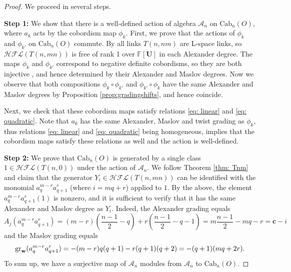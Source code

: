 \documentclass[10pt,a4paper]{amsart}
\newcommand{\CA}{\mathcal{A}}
\newcommand{\Cab}{\mathrm{Cab}}
\newcommand{\F}{\mathbb{F}}
\newcommand{\cHFL}{\mathcal{H\!F\! L}}
\newcommand{\w}{\mathbf{w}}
\def\gr{\textup{gr}}
\def\w{{\bf{w}}}
\newcommand{\UU}{\mathbf{U}}
\renewcommand{\AA}[1]{{\color{blue}#1}}
\newcommand{\cc}{\mathbf{c}}
\begin{document}
\begin{proof}
We proceed in several steps.

{\bf Step 1:} We show that there is a well-defined action of algebra $\CA_n$ on $\Cab_n(O)$, where $a_k$ acts by the cobordism map $\phi_k$. First, we prove that the actions of $\phi_{k}$ and $\phi_{k'}$ on $\Cab_n(O)$ commute. By \cite{GH} all links $T(n,nm)$ are L-space links, so $\cHFL(T(n,mn))$ is free of rank 1 over $\F[\UU]$ in each Alexander degree. The maps $\phi_{k}$ and $\phi_{k'}$ correspond to negative definite cobordisms, so they are both injective \cite{AGL}, and hence determined by their Alexander and Maslov degrees. Now we observe that both compositions $\phi_{k}\circ \phi_{k'}$ and $\phi_{k'}\circ \phi_{k}$
have the same Alexander and Maslov degrees by Proposition \ref{prop:gradingshifts}, and hence coincide.

Next, we check that these cobordism maps satisfy  relations \eqref{eq: linear} and \eqref{eq: quadratic}. Note that $a_k$ has the same Alexander, Maslov and twist grading as $\phi_k$, thus relations \eqref{eq: linear} and \eqref{eq: quadratic} being homogeneous, implies that the cobordism maps satisfy  these relations as well and the action is well-defined. 




{\bf Step 2:} We prove that $\Cab_n(O)$ is generated by a single class $1\in \cHFL(T(n,0))$ under the action of $\CA_n$. 
We follow Theorem \ref{thm: Tnm} and claim that the generator $Y_i\in \cHFL(T(n,mn))$ can be identified with the monomial $a_{q}^{m-r}a_{q+1}^{r}$ (where $i=mq+r$) applied to $1$.
By the above, the element $a_{q}^{m-r}a_{q+1}^{r}(1)$ is nonzero, and it is sufficient to verify that it has the same Alexander and Maslov degree as $Y_i$. Indeed, the Alexander grading equals
$$
A_j(a_{q}^{m-r}a_{q+1}^{r})=(m-r)\left(\frac{n-1}{2}-q\right)+r\left(\frac{n-1}{2}-q-1\right)=m\frac{n-1}{2}-mq-r=\cc-i
$$
and the Maslov grading equals
$$
\gr_{\w}(a_{q}^{m-r}a_{q+1}^{r})=-(m-r)q(q+1)-r(q+1)(q+2)=-(q+1)(mq+2r).
$$
To sum up, we have a surjective map of $\CA_n$ modules from $\CA_n$ to $\Cab_n(O)$.


\end{proof}
\end{document}
